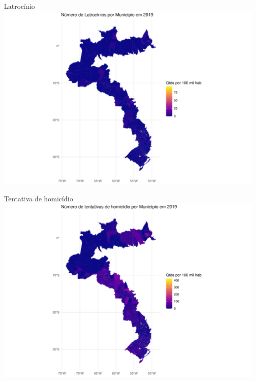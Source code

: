 \documentclass[
  ignorenonframetext,
]{beamer}
\begin{document}
\begin{frame}{Latrocínio}
\label{latrocuxednio}
\includegraphics{graficos_files/figure-beamer/unnamed-chunk-25-1.pdf}
\end{frame}

\begin{frame}{Tentativa de homicídio}
\label{tentativa-de-homicuxeddio}
\includegraphics{graficos_files/figure-beamer/unnamed-chunk-26-1.pdf}
\end{frame}
\end{document}
